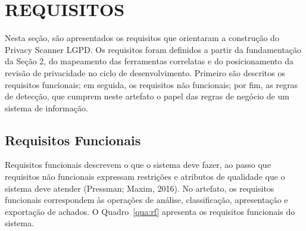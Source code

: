 \documentclass[12pt,a4paper,oneside]{report}
\begin{document}
\chapter{REQUISITOS}

Nesta seção, são apresentados os requisitos que orientaram a construção do Privacy Scanner LGPD. Os requisitos foram definidos a partir da fundamentação da Seção 2, do mapeamento das ferramentas correlatas e do posicionamento da revisão de privacidade no ciclo de desenvolvimento. Primeiro são descritos os requisitos funcionais; em seguida, os requisitos não funcionais; por fim, as regras de detecção, que cumprem neste artefato o papel das regras de negócio de um sistema de informação.

\section{Requisitos Funcionais}

Requisitos funcionais descrevem o que o sistema deve fazer, ao passo que requisitos não funcionais expressam restrições e atributos de qualidade que o sistema deve atender (Pressman; Maxim, 2016). No artefato, os requisitos funcionais correspondem às operações de análise, classificação, apresentação e exportação de achados. O Quadro~\ref{qua:rf} apresenta os requisitos funcionais do sistema.
\end{document}
